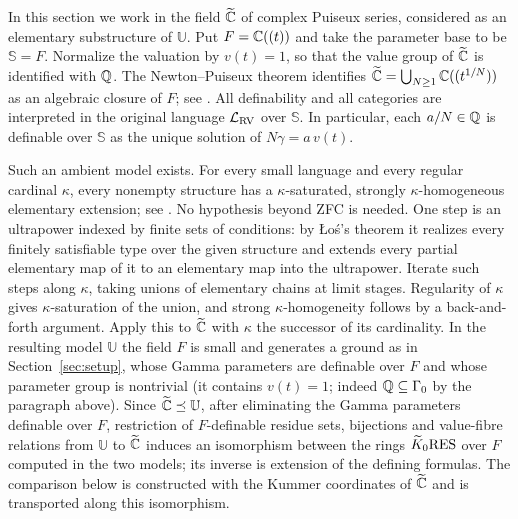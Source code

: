 In this section we work in the field $\widetilde{\mathbb C}$ of complex
Puiseux series, considered as an elementary substructure of
$\mathbb U$. Put $F=\mathbb C((t))$ and take the parameter base to be
$\mathbb S=F$. Normalize the valuation by $v(t)=1$, so that the
value group of $\widetilde{\mathbb C}$ is identified with $\mathbb Q$.
The Newton--Puiseux theorem identifies
$\widetilde{\mathbb C}=\bigcup_{N\geq1}\mathbb C((t^{1/N}))$ as an algebraic closure
of $F$; see \cite[Corollary 13.15]{Eisenbud}.
All definability and all categories are interpreted in the original
language $\mathcal L_{\mathrm{RV}}$ over $\mathbb S$. In particular, each
$a/N\in\mathbb Q$ is definable over $\mathbb S$ as the unique solution of
$N\gamma=a\,v(t)$.

\begin{rem}\label{rem:ambient}
Such an ambient model exists. For every small language and every regular cardinal
$\kappa$, every nonempty structure has a $\kappa$-saturated, strongly
$\kappa$-homogeneous elementary extension; see \cite[Section 4.3]{Marker}.
No hypothesis beyond ZFC is needed. One step is an ultrapower indexed by
finite sets of conditions: by \L o\'s's theorem it realizes every finitely
satisfiable type over the given structure and extends every partial
elementary map of it to an elementary map into the ultrapower. Iterate such
steps along $\kappa$, taking unions of elementary chains at limit stages.
Regularity of $\kappa$ gives $\kappa$-saturation of the union, and strong
$\kappa$-homogeneity follows by a back-and-forth argument.
Apply this to $\widetilde{\mathbb C}$ with $\kappa$ the successor of its
cardinality. In the resulting model $\mathbb U$ the field $F$ is small and
generates a ground as in Section~\ref{sec:setup}, whose Gamma parameters are
definable over $F$ and whose parameter group is nontrivial (it contains
$v(t)=1$; indeed $\mathbb Q\subseteq\Gamma_0$ by the paragraph above).
Since $\widetilde{\mathbb C}\preceq\mathbb U$, after eliminating the Gamma
parameters definable over $F$, restriction of $F$-definable residue
sets, bijections and value-fibre relations from $\mathbb U$ to
$\widetilde{\mathbb C}$ induces an isomorphism between the rings $\widetilde K_0\mathrm{RES}$ over
$F$ computed in the two models; its inverse is extension of the defining
formulas. The comparison below is constructed with the Kummer coordinates
of $\widetilde{\mathbb C}$ and is transported along this isomorphism.
\end{rem}

